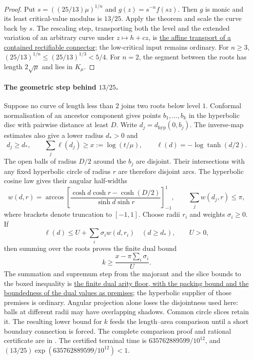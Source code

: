 \documentclass[11pt]{article}
\begin{document}
\begin{proof}
Put $s=((25/13)\mu)^{1/n}$ and $g(z)=s^{-n}f(sz)$.  Then $g$ is monic and
its least critical-value modulus is $13/25$.  Apply the theorem and scale the
curve back by $s$.  The rescaling step, transporting both the level and the
extended variation of an arbitrary curve under $z\mapsto h+cz$, is
\href{https://github.com/wcook04/plectis-erdos/blob/f36a98bf3d3e6f65f1074e3b800e3293d5b8a51a/ErdosProblems/Erdos1041/PaperMetricScaling.lean#L40}{the affine
transport of a contained rectifiable connector}; the low-critical input remains
ordinary.  For $n\ge3$,
$(25/13)^{1/n}\le(25/13)^{1/3}<5/4$.  For $n=2$, the segment between the
roots has length $2\sqrt\mu$ and lies in $K_\mu$.
\end{proof}

\paragraph{The geometric step behind $13/25$.}
Suppose no curve of length less than $2$ joins two roots below level $1$.
Conformal normalisation of an ancestor component gives points
$b_1,\ldots,b_k$ in the hyperbolic disc with pairwise distance at least $D$.
Write $d_j=d_{\mathrm{hyp}}(0,b_j)$.  The inverse-map estimates also give a
lower radius $d_*>0$ and
\[
 d_j\ge d_*,\qquad
 \sum_j\ell(d_j)\ge x:=\log(t/\mu),\qquad
 \ell(d)=-\log\tanh(d/2).
\]
The open balls of radius $D/2$ around the $b_j$ are disjoint.  Their
intersections with any fixed hyperbolic circle of radius $r$ are therefore
disjoint arcs.  The hyperbolic cosine law gives their angular half-widths
\[
 w(d,r)=\arccos\!\left[\frac{\cosh d\cosh r-\cosh(D/2)}
                              {\sinh d\sinh r}\right]_{-1}^{1},
 \qquad \sum_j w(d_j,r)\le\pi,
\]
where brackets denote truncation to $[-1,1]$.  Choose radii $r_i$ and weights
$\sigma_i\ge0$.  If
\[
 \ell(d)\le U+\sum_i\sigma_iw(d,r_i)\quad(d\ge d_*),\qquad U>0,
\]
then summing over the roots proves the finite dual bound
\[
 \boxed{\quad k\ge\frac{x-\pi\sum_i\sigma_i}{U}.\quad}
\]
The summation and supremum step from the majorant and the slice bounds to the
boxed inequality is
\href{https://github.com/wcook04/plectis-erdos/blob/f36a98bf3d3e6f65f1074e3b800e3293d5b8a51a/ErdosProblems/Erdos1041/PaperFiniteDual.lean#L68}{the finite dual
arity floor, with the packing bound and the boundedness of the dual values as
premises}; the hyperbolic supplier of those premises is ordinary.
Angular projection alone loses the disjointness used here: balls at different
radii may have overlapping shadows.  Common circle slices retain it.
The resulting lower bound for $k$ feeds the length--area comparison until a
short boundary connection is forced.  The complete comparison proof and
rational certificate are in
.
The certified terminal time is $635762889599/10^{12}$, and
$(13/25)\exp(635762889599/10^{12})<1$.
\end{document}
